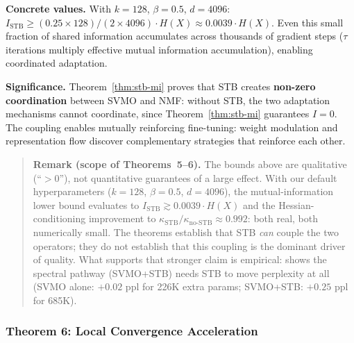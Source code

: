 \documentclass[conference]{IEEEtran}
\begin{document}
\textbf{Concrete values.} With $k = 128$, $\beta = 0.5$, $d = 4096$: $I_{\text{STB}} \geq (0.25 \times 128)/(2 \times 4096) \cdot H(X) \approx 0.0039 \cdot H(X)$. Even this small fraction of shared information accumulates across thousands of gradient steps ($\tau$ iterations multiply effective mutual information accumulation), enabling coordinated adaptation.

\textbf{Significance.} Theorem~\ref{thm:stb-mi} proves that STB creates \textbf{non-zero coordination} between SVMO and NMF: without STB, the two adaptation mechanisms cannot coordinate, since Theorem~\ref{thm:stb-mi} guarantees $I = 0$. The coupling enables mutually reinforcing fine-tuning: weight modulation and representation flow discover complementary strategies that reinforce each other.

\begin{quote}
\small
\textbf{Remark (scope of Theorems~5--6).} The bounds above are qualitative (``$>0$''), not quantitative guarantees of a large effect. With our default hyperparameters ($k{=}128$, $\beta{=}0.5$, $d{=}4096$), the mutual-information lower bound evaluates to $I_{\mathrm{STB}} \gtrsim 0.0039 \cdot H(X)$ and the Hessian-conditioning improvement to $\kappa_{\mathrm{STB}}/\kappa_{\mathrm{no\text{-}STB}} \approx 0.992$: both real, both numerically small. The theorems establish that STB \emph{can} couple the two operators; they do not establish that this coupling is the dominant driver of quality. What supports that stronger claim is empirical:  shows the spectral pathway (SVMO+STB) needs STB to move perplexity at all (SVMO alone: $+0.02$ ppl for 226K extra params; SVMO+STB: $+0.25$ ppl for 685K).
\end{quote}

\subsubsection{Theorem 6: Local Convergence Acceleration}
\end{document}
